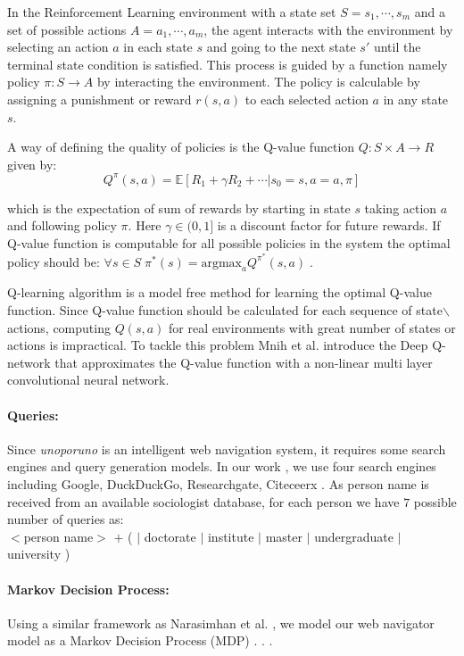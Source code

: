 In the Reinforcement Learning environment with a state set $S = s_1, \cdots, s_m$ and a  set of possible actions $A = a_1, \cdots, a_m$, the agent interacts with the environment by selecting an action $a$ in each state $s$ and going to the next state $s'$ until the terminal state condition is satisfied. This process is guided by a function namely policy $\pi : S \longrightarrow A$ by interacting the environment. The policy is calculable by assigning a punishment or reward $r(s, a)$ to each selected action $a$ in any state $s$.  

A way of defining the quality of policies is the Q-value function $Q : S \times A \longrightarrow R$ given by: 
$$Q^{\pi}(s, a) = \mathbb{E}[R_1+ \gamma R_2 + \cdots | s_0 = s, a =a, \pi]$$

which is the expectation of sum of rewards by starting in state $s$ taking action $a$ and following policy $\pi$. Here $\gamma \in (0, 1]$ is a discount factor for future rewards. If Q-value function is computable for all possible policies in the system the optimal policy should be: $\forall  s \in S \; \pi^*(s) = \text{argmax}_a Q^{\pi^*}(s, a) \; $.  

Q-learning algorithm \cite{puterman1994} is a model free method for learning the optimal Q-value function. Since Q-value function should be calculated for each sequence of state$\backslash$actions, computing $Q(s, a)$ for real environments with great number of states or actions  is impractical.  To tackle this problem Mnih et al.  introduce the Deep Q-network that approximates the Q-value function with a non-linear multi layer convolutional neural network. 

\paragraph{Queries: }  Since \textit{unoporuno} is an intelligent web navigation system, it requires some search engines and query generation models. In our work , we use four search engines including Google, DuckDuckGo, Researchgate, Citeceerx  . As person name is received from an available sociologist database, for each person we have $7$ possible number of queries as: \\

$<$person name$>$ $+$ (  $|$ doctorate $|$ institute $|$ master $|$ undergraduate $|$ university ) 

\paragraph{Markov Decision Process: } Using a similar framework as Narasimhan et al. , we model our web navigator model as a Markov Decision Process (MDP) \cite{puterman1994}. . .

